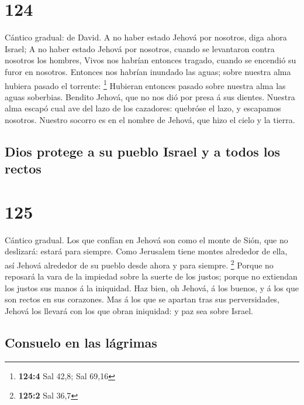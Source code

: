 \hypertarget{section-123}{%
\section{124}\label{section-123}}

 Cántico gradual: de David. A no haber estado Jehová por
nosotros, diga ahora Israel;  A no haber estado Jehová por
nosotros, cuando se levantaron contra nosotros los hombres, 
Vivos nos habrían entonces tragado, cuando se encendió su furor en
nosotros.  Entonces nos habrían inundado las aguas; sobre
nuestra alma hubiera pasado el torrente: \footnote{\textbf{124:4} Sal
  42,8; Sal 69,16}  Hubieran entonces pasado sobre nuestra
alma las aguas soberbias.  Bendito Jehová, que no nos dió
por presa á sus dientes.  Nuestra alma escapó cual ave del
lazo de los cazadores: quebróse el lazo, y escapamos nosotros.
 Nuestro socorro es en el nombre de Jehová, que hizo el
cielo y la tierra.

\hypertarget{dios-protege-a-su-pueblo-israel-y-a-todos-los-rectos}{%
\subsection{Dios protege a su pueblo Israel y a todos los
rectos}\label{dios-protege-a-su-pueblo-israel-y-a-todos-los-rectos}}

\hypertarget{section-124}{%
\section{125}\label{section-124}}

 Cántico gradual. Los que confían en Jehová son como el
monte de Sión, que no deslizará: estará para siempre.  Como
Jerusalem tiene montes alrededor de ella, así Jehová alrededor de su
pueblo desde ahora y para siempre. \footnote{\textbf{125:2} Sal 36,7}
 Porque no reposará la vara de la impiedad sobre la suerte
de los justos; porque no extiendan los justos sus manos á la iniquidad.
 Haz bien, oh Jehová, á los buenos, y á los que son rectos
en sus corazones.  Mas á los que se apartan tras sus
perversidades, Jehová los llevará con los que obran iniquidad: y paz sea
sobre Israel.

\hypertarget{consuelo-en-las-luxe1grimas}{%
\subsection{Consuelo en las
lágrimas}\label{consuelo-en-las-luxe1grimas}}

